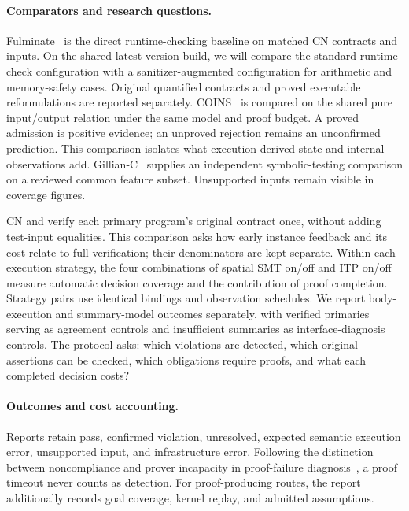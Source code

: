 \paragraph{Comparators and research questions.}
Fulminate~\cite{banerjee2025fulminate} is the direct runtime-checking baseline on matched CN contracts and
inputs. On the shared latest-version build, we will compare the standard
runtime-check configuration with a sanitizer-augmented configuration for
arithmetic and memory-safety cases.
Original quantified contracts and proved executable reformulations are
reported separately. COINS~\cite{yang2026coins} is compared on the shared pure input/output relation under the same
model and proof budget. A proved admission is positive evidence;
an unproved rejection remains an unconfirmed prediction. This comparison
isolates what execution-derived state and
internal observations add. Gillian-C~\cite{santos2020gillian,maksimovic2021gillian} supplies
an independent symbolic-testing comparison on a reviewed common feature
subset. Unsupported inputs remain visible in coverage figures.

CN and \qcp{} verify each primary program's original contract once, without
adding test-input equalities. This comparison asks how early instance
feedback and its cost relate to full verification; their denominators are
kept separate. Within each execution strategy, the four combinations of spatial SMT on/off
and ITP on/off measure automatic decision coverage and the contribution of
proof completion. Strategy pairs use identical bindings and observation
schedules. We report body-execution and summary-model outcomes separately,
with verified primaries serving as agreement controls and insufficient
summaries as interface-diagnosis controls.
The protocol asks: which violations are detected, which original assertions
can be checked, which obligations require proofs, and what each completed
decision costs?

\paragraph{Outcomes and cost accounting.}
Reports retain pass, confirmed violation, unresolved, expected semantic
execution error, unsupported input, and infrastructure error. Following the distinction between noncompliance and prover incapacity
in proof-failure diagnosis~\cite{petiot2018stady}, a proof timeout never
counts as detection. For proof-producing routes, the report additionally
records goal coverage, kernel replay, and admitted assumptions.

